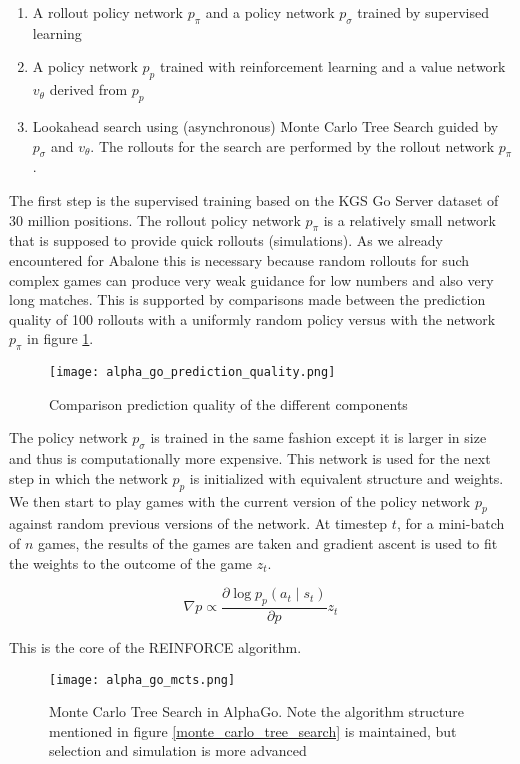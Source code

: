 \begin{enumerate}
    \item A rollout policy network $p_{\pi}$ and a policy network $p_{\sigma}$ trained by supervised learning
    \item A policy network $p_p$ trained with reinforcement learning and a value network $v_{\theta}$ derived from $p_p$
    \item Lookahead search using (asynchronous) Monte Carlo Tree Search guided by $p_{\sigma}$ and $v_{\theta}$. The rollouts for the search are performed by the rollout network $p_{\pi}$.
\end{enumerate}

The first step is the supervised training based on the KGS Go Server dataset of 30 million positions. The rollout policy network $p_{\pi}$ is a relatively small network that is supposed to provide quick rollouts (simulations). As we already encountered for Abalone this is necessary because random rollouts for such complex games can produce very weak guidance for low numbers and also very long matches. This is supported by comparisons made between the prediction quality of 100 rollouts with a uniformly random policy versus with the network $p_{\pi}$ in figure \ref{alpha_go_prediction_quality}.

\begin{figure}
    \centering
    \texttt{[image: alpha\_go\_prediction\_quality.png]}
    \caption{Comparison prediction quality of the different components \cite{silver_mastering_2016}}
    \label{alpha_go_prediction_quality}
\end{figure}

The policy network $p_{\sigma}$ is trained in the same fashion except it is larger in size and thus is computationally more expensive. This network is used for the next step in which the network $p_{p}$ is initialized with equivalent structure and weights. We then start to play games with the current version of the policy network $p_{p}$ against random previous versions of the network. At timestep $t$, for a mini-batch of $n$ games, the results of the games are taken and gradient ascent is used to fit the weights to the outcome of the game $z_t$.

$$
    \nabla p \propto \frac{\partial \log p_p(a_t \mid s_t)}{\partial p}z_t
$$

This is the core of the REINFORCE algorithm. \cite{williams_simple_nodate}
\begin{figure}
    \centering
    \texttt{[image: alpha\_go\_mcts.png]}
    \caption{Monte Carlo Tree Search in AlphaGo. \cite{silver_mastering_2016} Note the algorithm structure mentioned in figure \ref{monte_carlo_tree_search} is maintained, but selection and simulation is more advanced}
    \label{alpha_go_mcts}
\end{figure}

